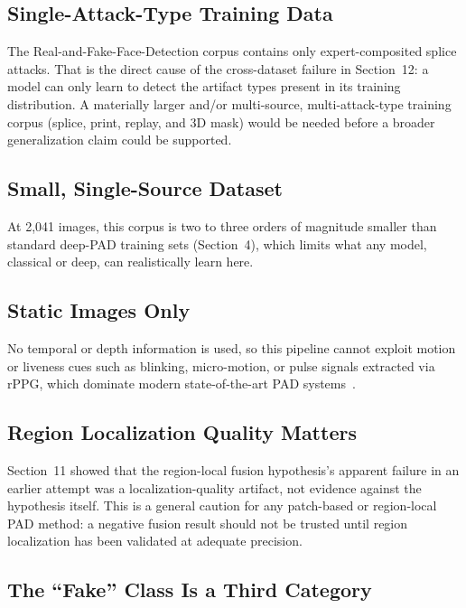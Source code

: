 \documentclass[11pt]{article}
\begin{document}
\subsection{Single-Attack-Type Training Data}

The Real-and-Fake-Face-Detection corpus contains only expert-composited splice attacks. That is the direct cause of the cross-dataset failure in Section~12: a model can only learn to detect the artifact types present in its training distribution. A materially larger and/or multi-source, multi-attack-type training corpus (splice, print, replay, and 3D mask) would be needed before a broader generalization claim could be supported.

\subsection{Small, Single-Source Dataset}

At 2,041 images, this corpus is two to three orders of magnitude smaller than standard deep-PAD training sets (Section~4), which limits what any model, classical or deep, can realistically learn here.

\subsection{Static Images Only}

No temporal or depth information is used, so this pipeline cannot exploit motion or liveness cues such as blinking, micro-motion, or pulse signals extracted via rPPG, which dominate modern state-of-the-art PAD systems~\cite{liu2018}.

\subsection{Region Localization Quality Matters}

Section~11 showed that the region-local fusion hypothesis's apparent failure in an earlier attempt was a localization-quality artifact, not evidence against the hypothesis itself. This is a general caution for any patch-based or region-local PAD method: a negative fusion result should not be trusted until region localization has been validated at adequate precision.

\subsection{The ``Fake'' Class Is a Third Category}
\end{document}
